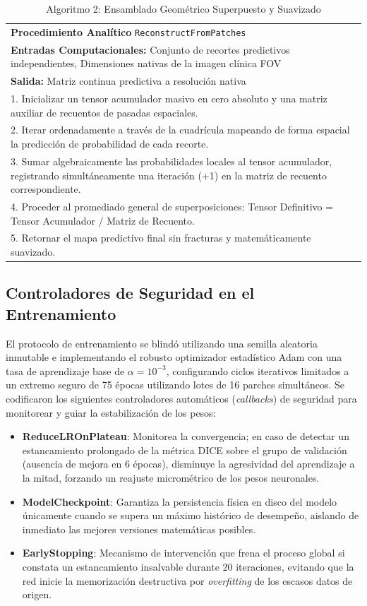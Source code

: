\documentclass[conference]{IEEEtran}
\begin{document}
\begin{table}[htbp]
\centering
\caption{Algoritmo 2: Ensamblado Geométrico Superpuesto y Suavizado}
\label{tab:pseudocode2}
\begin{tabular}{|p{8cm}|}
\hline
\textbf{Procedimiento Analítico} \texttt{ReconstructFromPatches} \\
\textbf{Entradas Computacionales:} Conjunto de recortes predictivos independientes, Dimensiones nativas de la imagen clínica FOV \\
\textbf{Salida:} Matriz continua predictiva a resolución nativa \\
1. Inicializar un tensor acumulador masivo en cero absoluto y una matriz auxiliar de recuentos de pasadas espaciales. \\
2. Iterar ordenadamente a través de la cuadrícula mapeando de forma espacial la predicción de probabilidad de cada recorte. \\
3. Sumar algebraicamente las probabilidades locales al tensor acumulador, registrando simultáneamente una iteración (+1) en la matriz de recuento correspondiente. \\
4. Proceder al promediado general de superposiciones: Tensor Definitivo = Tensor Acumulador / Matriz de Recuento. \\
5. Retornar el mapa predictivo final sin fracturas y matemáticamente suavizado. \\
\hline
\end{tabular}
\end{table}

\subsection{Controladores de Seguridad en el Entrenamiento}
El protocolo de entrenamiento se blindó utilizando una semilla aleatoria inmutable e implementando el robusto optimizador estadístico Adam con una tasa de aprendizaje base de $\alpha=10^{-3}$, configurando ciclos iterativos limitados a un extremo seguro de 75 épocas utilizando lotes de 16 parches simultáneos. Se codificaron los siguientes controladores automáticos (\textit{callbacks}) de seguridad para monitorear y guiar la estabilización de los pesos:
\begin{itemize}
    \item \textbf{ReduceLROnPlateau}: Monitorea la convergencia; en caso de detectar un estancamiento prolongado de la métrica DICE sobre el grupo de validación (ausencia de mejora en 6 épocas), disminuye la agresividad del aprendizaje a la mitad, forzando un reajuste micrométrico de los pesos neuronales.
    \item \textbf{ModelCheckpoint}: Garantiza la persistencia física en disco del modelo únicamente cuando se supera un máximo histórico de desempeño, aislando de inmediato las mejores versiones matemáticas posibles.
    \item \textbf{EarlyStopping}: Mecanismo de intervención que frena el proceso global si constata un estancamiento insalvable durante 20 iteraciones, evitando que la red inicie la memorización destructiva por \textit{overfitting} de los escasos datos de origen.
\end{itemize}
\end{document}
